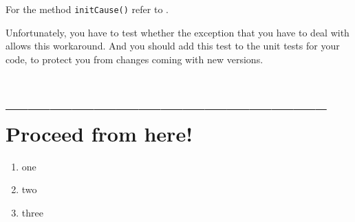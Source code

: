 \documentclass[11pt,a4paper, titlepage, parskip=half, headsepline, footsepline, cleardoublepage=current, headheight=1cm]{scrbook}
\begin{document}
For the method \lstinline|initCause()| refer to \autocite{ORACLE_DOC_THROWABLE:initCause}.

Unfortunately, you have to test whether the exception that you have to deal with allows this workaround. And you should add this test to the unit tests for your code, to protect you from changes coming with new versions.







\hrulefill\newpage 
\section{-------------------------------------------- Proceed from here!}
\lipsum[1]

\begin{enumerate}[label=P\arabic*.]
\item one
\item two
\item three
\end{enumerate}

\begin{lstlisting}[numbers=left]
\end{lstlisting}

\end{document}
